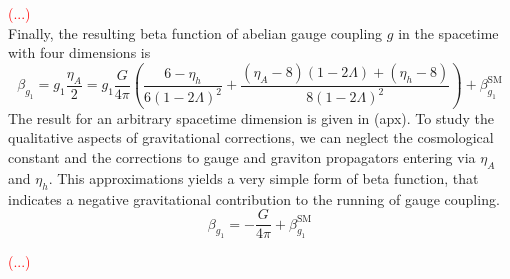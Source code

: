\documentclass[11pt, a4paper]{article}
\begin{document}
\textcolor{red}{(...)}\\

Finally, the resulting beta function of abelian gauge coupling $g$ in the spacetime with four dimensions is
\begin{equation}
    \beta_{g_1} = g_1 \frac{\eta_A}{2} = g_1 \frac{G}{4 \pi} \left( \frac{6 - \eta_h}{6(1-2 \Lambda)^2} + 
    \frac{(\eta_A-8)(1-2\Lambda) + (\eta_h -8)}{8 (1-2 \Lambda )^2}\right) + \beta_{g_1}^{\text{SM}}
\end{equation}
The result for an arbitrary spacetime dimension is given in (apx).
To study the qualitative aspects of gravitational corrections, we can neglect the cosmological constant and
the corrections to gauge and graviton propagators entering via $\eta_A$ and $\eta_h$. This approximations
yields a very simple form of beta function, that indicates a negative gravitational contribution to the running
of gauge coupling.
\begin{equation}
    \beta_{g_1} = - \frac{G}{4 \pi} + \beta_{g_1}^{\text{SM}}
\end{equation}

\textcolor{red}{(...)}\\
\end{document}
